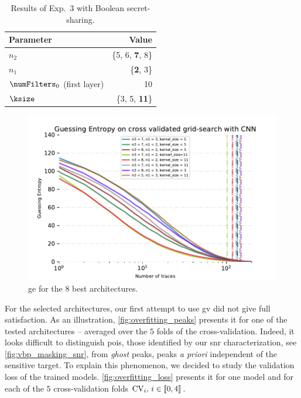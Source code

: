 \begin{table}
    \begin{subtable}{.49\textwidth}
        \centering
        \caption{Architecture \glspl{hp} -- bold values refer to the best choices.}
        \label{table:ge_masking_hp}
        \begin{tabular}{l r}
            \toprule
            Parameter & Value \\
            \midrule
            \(n_2\) & \{5, 6, \textbf{7}, 8\} \\
            \(n_1\) & \{\textbf{2}, 3\} \\
            \(\numFilters_0\) (first layer) & 10 \\
            \(\ksize\) & \{3, 5, \textbf{11}\} \\
            \bottomrule
        \end{tabular}
    \end{subtable}
    \begin{subfigure}{.49\textwidth}
        \centering
        \includegraphics[width=\textwidth]{figures/ASCAD_700/with_mask_no_desynchro/GE_best_nodes}
        \caption{\gls{ge} for the \(8\) best architectures.}
        \label{table:ge_masking_perf}
    \end{subfigure}
    \caption{Results of Exp.~3 with Boolean secret-sharing.}
    \label{table:ge_masking}
\end{table}


For the selected architectures, our first attempt to use \gls{gv} did not give full satisfaction.
As an illustration, \autoref{fig:overfitting_peaks} presents it for one of the tested architectures -- averaged over the \(5\) folds of the cross-validation.
Indeed, it looks difficult to distinguish \glspl{poi}, \ie{} those identified by our \gls{snr} characterization, see \autoref{fig:vbp_masking_snr}, from \emph{ghost} peaks, \ie{} peaks \textit{a priori} independent of the sensitive target.
To explain this phenomenon, we decided to study the validation loss of the trained models.
\autoref{fig:overfitting_loss} presents it for one model and for each of the \(5\) cross-validation folds \(\mathrm{CV}_i$, $i\in \llbracket 0, 4 \rrbracket\).

